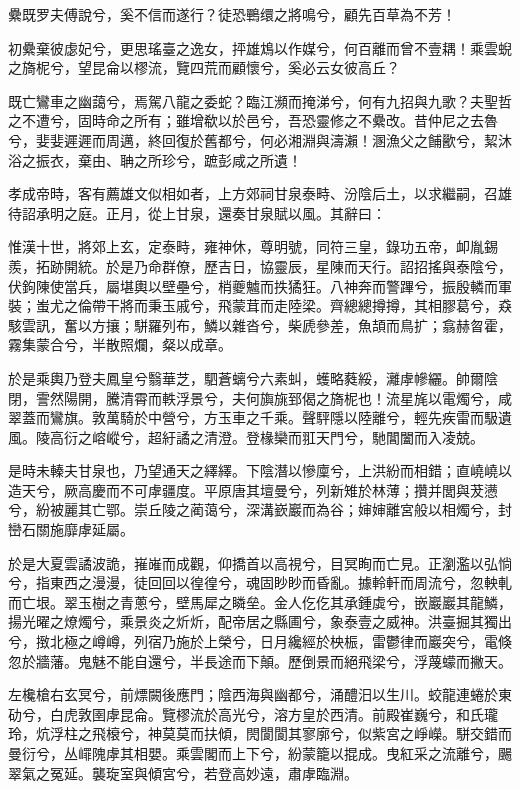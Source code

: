 \begin{pinyinscope}
纍既罗夫傅說兮，奚不信而遂行？徒恐鷤缳之將鳴兮，顧先百草為不芳！

初纍棄彼虙妃兮，更思瑤臺之逸女，抨雄鴆以作媒兮，何百離而曾不壹耦！乘雲蜺之旖柅兮，望昆侖以樛流，覽四荒而顧懷兮，奚必云女彼高丘？

既亡鸞車之幽藹兮，焉駕八龍之委蛇？臨江瀕而掩涕兮，何有九招與九歌？夫聖哲之不遭兮，固時命之所有；雖增欷以於邑兮，吾恐靈修之不纍改。昔仲尼之去魯兮，婓婓遲遲而周邁，終回復於舊都兮，何必湘淵與濤瀨！溷漁父之餔歠兮，絜沐浴之振衣，棄由、聃之所珍兮，蹠彭咸之所遺！

孝成帝時，客有薦雄文似相如者，上方郊祠甘泉泰畤、汾陰后土，以求繼嗣，召雄待詔承明之庭。正月，從上甘泉，還奏甘泉賦以風。其辭曰：

惟漢十世，將郊上玄，定泰畤，雍神休，尊明號，同符三皇，錄功五帝，卹胤錫羨，拓跡開統。於是乃命群僚，歷吉日，協靈辰，星陳而天行。詔招搖與泰陰兮，伏鉤陳使當兵，屬堪輿以壁壘兮，梢夔魖而抶獝狂。八神奔而警蹕兮，振殷轔而軍裝；蚩尤之倫帶干將而秉玉戚兮，飛蒙茸而走陸梁。齊總總撙撙，其相膠葛兮，猋駭雲訊，奮以方攘；駢羅列布，鱗以雜沓兮，柴虒參差，魚頡而鳥扩；翕赫曶霍，霧集蒙合兮，半散照爛，粲以成章。

於是乘輿乃登夫鳳皇兮翳華芝，駟蒼螭兮六素虯，蠖略蕤綏，灕虖幓纚。帥爾陰閉，霅然陽開，騰清霄而軼浮景兮，夫何旟旐郅偈之旖柅也！流星旄以電燭兮，咸翠蓋而鸞旗。敦萬騎於中營兮，方玉車之千乘。聲駍隱以陸離兮，輕先疾雷而馺遺風。陵高衍之嵱嵷兮，超紆譎之清澄。登椽欒而羾天門兮，馳閶闔而入凌兢。

是時未轃夫甘泉也，乃望通天之繹繹。下陰潛以慘廩兮，上洪紛而相錯；直嶢嶢以造天兮，厥高慶而不可虖疆度。平原唐其壇曼兮，列新雉於林薄；攢并閭與茇懑兮，紛被麗其亡鄂。崇丘陵之蔺蔼兮，深溝嶔巖而為谷；婶婶離宮般以相燭兮，封巒石關施靡虖延屬。

於是大夏雲譎波詭，嶊嶉而成觀，仰撟首以高視兮，目冥眴而亡見。正瀏濫以弘惝兮，指東西之漫漫，徒回回以徨徨兮，魂固眇眇而昏亂。據軨軒而周流兮，忽軮軋而亡垠。翠玉樹之青蔥兮，壁馬犀之瞵垒。金人仡仡其承鍾虡兮，嵌巖巖其龍鱗，揚光曜之燎燭兮，乘景炎之炘炘，配帝居之縣圃兮，象泰壹之威神。洪臺掘其獨出兮，㨖北極之嶟嶟，列宿乃施於上榮兮，日月纔經於柍桭，雷鬱律而巖突兮，電倏忽於牆藩。鬼魅不能自還兮，半長途而下顛。歷倒景而絕飛梁兮，浮蔑蠓而撇天。

左欃槍右玄冥兮，前熛闕後應門；陰西海與幽都兮，涌醴汨以生川。蛟龍連蜷於東劯兮，白虎敦圉虖昆侖。覽樛流於高光兮，溶方皇於西清。前殿崔巍兮，和氏瓏玲，炕浮柱之飛榱兮，神莫莫而扶傾，閌閬閬其寥廓兮，似紫宮之崢嶸。駢交錯而曼衍兮，丛嶵隗虖其相嬰。乘雲閣而上下兮，紛蒙籠以掍成。曳紅采之流離兮，颺翠氣之冤延。襲琁室與傾宮兮，若登高妙遠，肅虖臨淵。


\end{pinyinscope}
